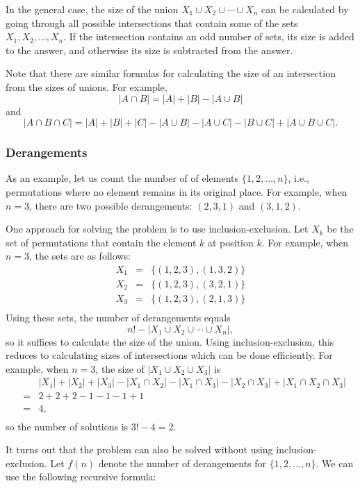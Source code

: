 In the general case, the size of the 
union $X_1 \cup X_2 \cup \cdots \cup X_n$
can be calculated by going through all possible
intersections that contain some of the sets $X_1,X_2,\ldots,X_n$.
If the intersection contains an odd number of sets,
its size is added to the answer,
and otherwise its size is subtracted from the answer.

Note that there are similar formulas
for calculating
the size of an intersection from the sizes of
unions. For example,
\[ |A \cap B| = |A| + |B| - |A \cup B|\]
and
\[ |A \cap B \cap C| = |A| + |B| + |C| - |A \cup B|  - |A \cup C|  - |B \cup C| + |A \cup B \cup C| .\]

\subsubsection{Derangements}


As an example, let us count the number of 
of elements $\{1,2,\ldots,n\}$, i.e., permutations
where no element remains in its original place.
For example, when $n=3$, there are
two possible derangements: $(2,3,1)$ and $(3,1,2)$.

One approach for solving the problem is to use
inclusion-exclusion.
Let $X_k$ be the set of permutations
that contain the element $k$ at position $k$.
For example, when $n=3$, the sets are as follows:
\[
\begin{array}{lcl}
X_1 & = & \{(1,2,3),(1,3,2)\} \\
X_2 & = & \{(1,2,3),(3,2,1)\} \\
X_3 & = & \{(1,2,3),(2,1,3)\} \\
\end{array}
\]
Using these sets, the number of derangements equals
\[ n! - |X_1 \cup X_2 \cup \cdots \cup X_n|, \]
so it suffices to calculate the size of the union.
Using inclusion-exclusion, this reduces to
calculating sizes of intersections which can be
done efficiently.
For example, when $n=3$, the size of
$|X_1 \cup X_2 \cup X_3|$ is
\[
\begin{array}{lcl}
 & & |X_1| + |X_2| + |X_3| - |X_1 \cap X_2|  - |X_1 \cap X_3|  - |X_2 \cap X_3| + |X_1 \cap X_2 \cap X_3| \\
 & = & 2+2+2-1-1-1+1 \\
 & = & 4, \\
\end{array}
\]
so the number of solutions is $3!-4=2$.

It turns out that the problem can also be solved
without using inclusion-exclusion.
Let $f(n)$ denote the number of derangements
for $\{1,2,\ldots,n\}$. We can use the following
recursive formula:

